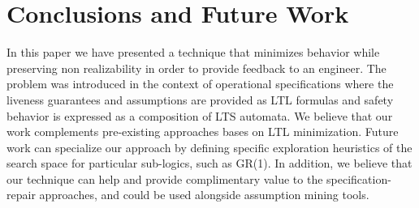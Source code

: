 \section{Conclusions and Future Work}\label{sec:conclusion}
In this paper we have presented a technique that minimizes behavior while
preserving non realizability in order to provide feedback to an engineer.
The problem was introduced in the context of operational specifications where
the liveness guarantees and assumptions are provided as LTL formulas and safety behavior
is expressed as a composition of LTS automata.  %
We believe that our work complements pre-existing approaches bases on LTL minimization. 
Future work can specialize
our approach by defining specific exploration heuristics of the search space for particular sub-logics, such as GR(1).  
In addition, we believe that our technique can help and provide complimentary value to the
specification-repair approaches, and could be used alongside assumption mining
tools.

